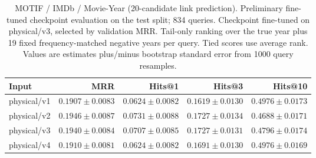 \begin{table}[t]
\centering
\small
\begin{tabular}{lrrrr}
\toprule
Input & MRR & Hits@1 & Hits@3 & Hits@10 \\
\midrule
physical/v1 & $0.1907 \pm 0.0083$ & $0.0624 \pm 0.0082$ & $0.1619 \pm 0.0130$ & $0.4976 \pm 0.0173$ \\
physical/v2 & $0.1946 \pm 0.0087$ & $0.0731 \pm 0.0088$ & $0.1727 \pm 0.0134$ & $0.4688 \pm 0.0171$ \\
physical/v3 & $0.1940 \pm 0.0084$ & $0.0707 \pm 0.0085$ & $0.1727 \pm 0.0131$ & $0.4796 \pm 0.0174$ \\
physical/v4 & $0.1910 \pm 0.0081$ & $0.0624 \pm 0.0082$ & $0.1691 \pm 0.0130$ & $0.4976 \pm 0.0169$ \\
\bottomrule
\end{tabular}
\caption{MOTIF / IMDb / Movie-Year (20-candidate link prediction). Preliminary fine-tuned checkpoint evaluation on the test split; 834 queries. Checkpoint fine-tuned on physical/v3, selected by validation MRR. Tail-only ranking over the true year plus 19 fixed frequency-matched negative years per query. Tied scores use average rank. Values are estimates plus/minus bootstrap standard error from 1000 query resamples.}
\label{tab:motif-movie_year-link_prediction}
\end{table}
